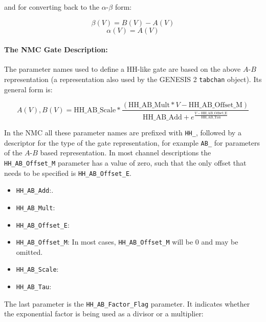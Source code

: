 \documentclass[12pt]{article}
\begin{document}
and for converting back to the $\alpha$-$\beta$ form:

\begin{equation}
  \beta(V) = B(V) - A(V)
\end{equation}
\begin{equation}
  \alpha(V) = A(V)
\end{equation}

\paragraph{The NMC Gate Description:} The parameter names used to define a HH-like gate are based on the
above $A$-$B$ representation (a representation also used by the
GENESIS 2 {\tt tabchan} object).  Its general form is:

\begin{equation}
  \label{eq:hh-general-1}
  A(V), B(V) = \mathrm{HH\_AB\_Scale} * \frac{ ( \mathrm{HH\_AB\_Mult} * V - \mathrm{HH\_AB\_Offset\_M} ) }{ \mathrm{HH\_AB\_Add} + e ^ {\frac{ V - \mathrm{HH\_AB\_Offset\_E} }{ \mathrm{HH\_AB\_Tau} } } }
\end{equation}

In the NMC all these parameter names are prefixed with {\tt HH\_},
followed by a descriptor for the type of the gate representation, for
example {\tt AB\_} for parameters of the $A$-$B$ based representation.
In most channel descriptions the {\tt HH\_AB\_Offset\_M} parameter has a
value of zero, such that the only offset that needs to be specified is
{\tt HH\_AB\_Offset\_E}.

\begin{itemize}
\item {\tt HH\_AB\_Add}:.
\item {\tt HH\_AB\_Mult}:
\item {\tt HH\_AB\_Offset\_E}:
\item {\tt HH\_AB\_Offset\_M}: In most cases, {\tt HH\_AB\_Offset\_M} will be 0
  and may be omitted.
\item {\tt HH\_AB\_Scale}:
\item {\tt HH\_AB\_Tau}:
\end{itemize}

The last parameter is the {\tt HH\_AB\_Factor\_Flag} parameter.  It
indicates whether the exponential factor is being used as a divisor or
a multiplier:
\end{document}
